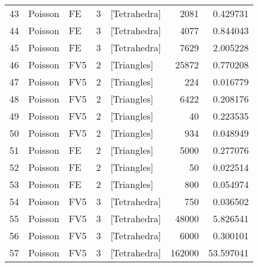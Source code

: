 \begin{tabular}{lllrlrr}
43 &   Poisson &                    FE &               3 &   [Tetrahedra] &                     2081 &                         0.429731 \\
44 &   Poisson &                    FE &               3 &   [Tetrahedra] &                     4077 &                         0.844043 \\
45 &   Poisson &                    FE &               3 &   [Tetrahedra] &                     7629 &                         2.005228 \\
46 &   Poisson &                   FV5 &               2 &    [Triangles] &                    25872 &                         0.770208 \\
47 &   Poisson &                   FV5 &               2 &    [Triangles] &                      224 &                         0.016779 \\
48 &   Poisson &                   FV5 &               2 &    [Triangles] &                     6422 &                         0.208176 \\
49 &   Poisson &                   FV5 &               2 &    [Triangles] &                       40 &                         0.223535 \\
50 &   Poisson &                   FV5 &               2 &    [Triangles] &                      934 &                         0.048949 \\
51 &   Poisson &                    FE &               2 &    [Triangles] &                     5000 &                         0.277076 \\
52 &   Poisson &                    FE &               2 &    [Triangles] &                       50 &                         0.022514 \\
53 &   Poisson &                    FE &               2 &    [Triangles] &                      800 &                         0.054974 \\
54 &   Poisson &                   FV5 &               3 &   [Tetrahedra] &                      750 &                         0.036502 \\
55 &   Poisson &                   FV5 &               3 &   [Tetrahedra] &                    48000 &                         5.826541 \\
56 &   Poisson &                   FV5 &               3 &   [Tetrahedra] &                     6000 &                         0.300101 \\
57 &   Poisson &                   FV5 &               3 &   [Tetrahedra] &                   162000 &                        53.597041 \\

\end{tabular}
